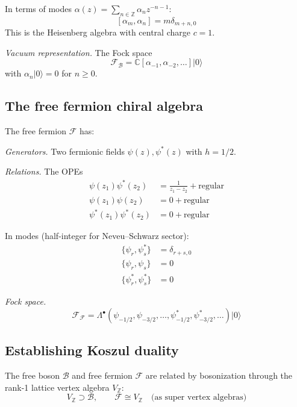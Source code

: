 In terms of modes $\alpha(z) = \sum_{n \in \mathbb{Z}} \alpha_n z^{-n-1}$:
\[
[\alpha_m, \alpha_n] = m \delta_{m+n,0}
\]
This is the Heisenberg algebra with central charge $c = 1$.

\emph{Vacuum representation.} The Fock space
\[
\mathcal{F}_{\mathcal{B}} = \mathbb{C}[\alpha_{-1}, \alpha_{-2}, \ldots] |0\rangle
\]
with $\alpha_n |0\rangle = 0$ for $n \geq 0$.

\subsection{The free fermion chiral algebra}

The free fermion $\mathcal{F}$ has:

\emph{Generators.} Two fermionic fields $\psi(z), \psi^*(z)$ with $h = 1/2$.

\emph{Relations.} The OPEs
\begin{align}
\psi(z_1)\psi^*(z_2) &= \frac{1}{z_1-z_2} + \text{regular} \\
\psi(z_1)\psi(z_2) &= 0 + \text{regular} \\
\psi^*(z_1)\psi^*(z_2) &= 0 + \text{regular}
\end{align}

In modes (half-integer for Neveu--Schwarz sector):
\begin{align}
\{\psi_r, \psi^*_s\} &= \delta_{r+s,0} \\
\{\psi_r, \psi_s\} &= 0 \\
\{\psi^*_r, \psi^*_s\} &= 0
\end{align}

\emph{Fock space.}
\[
\mathcal{F}_{\mathcal{F}} = \Lambda^{\bullet}(\psi_{-1/2}, \psi_{-3/2}, \ldots, \psi^*_{-1/2}, \psi^*_{-3/2}, \ldots) |0\rangle
\]

\subsection{Establishing Koszul duality}

\begin{theorem}\label{thm:boson-fermion-lattice}
The free boson $\mathcal{B}$ and free fermion $\mathcal{F}$ are related by bosonization through the rank-1 lattice vertex algebra $V_{\mathbb{Z}}$:
\[
V_{\mathbb{Z}} \supset \mathcal{B}, \qquad \mathcal{F} \cong V_{\mathbb{Z}} \quad \text{(as super vertex algebras)}
\]
\end{theorem}


